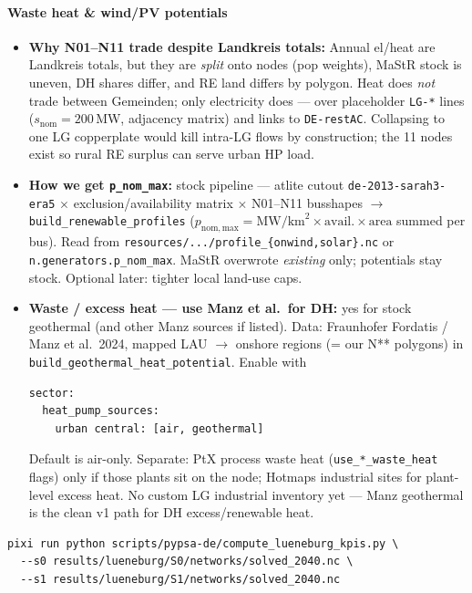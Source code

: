 \documentclass[11pt,a4paper]{article}
\begin{document}
\paragraph{Waste heat \& wind/PV potentials}
\begin{itemize}[leftmargin=*]
  \item \textbf{Why N01--N11 trade despite Landkreis totals:}
        Annual el/heat are Landkreis totals, but they are \emph{split} onto
        nodes (pop weights), MaStR stock is uneven, DH shares differ, and
        RE land differs by polygon. Heat does \emph{not} trade between
        Gemeinden; only electricity does --- over placeholder
        \texttt{LG-*} lines ($s_\mathrm{nom}=200$\,MW, adjacency matrix) and
        links to \texttt{DE-restAC}. Collapsing to one LG copperplate would
        kill intra-LG flows by construction; the 11 nodes exist so rural RE
        surplus can serve urban HP load.
  \item \textbf{How we get \texttt{p\_nom\_max}:}
        stock pipeline --- atlite cutout
        \texttt{de-2013-sarah3-era5} $\times$ exclusion/availability matrix
        $\times$ N01--N11 busshapes $\to$
        \texttt{build\_renewable\_profiles}
        ($p_\mathrm{nom,max}=\mathrm{MW/km}^2\times\mathrm{avail.}\times\mathrm{area}$
        summed per bus). Read from
        \texttt{resources/.../profile\_\{onwind,solar\}.nc} or
        \texttt{n.generators.p\_nom\_max}. MaStR overwrote \emph{existing}
        only; potentials stay stock. Optional later: tighter local land-use
        caps.
  \item \textbf{Waste / excess heat --- use Manz et al.\ for DH:}
        yes for stock geothermal (and other Manz sources if listed).
        Data: Fraunhofer Fordatis / Manz et al.\ 2024, mapped LAU $\to$
        onshore regions (= our N** polygons) in
        \texttt{build\_geothermal\_heat\_potential}. Enable with
\begin{lstlisting}
sector:
  heat_pump_sources:
    urban central: [air, geothermal]
\end{lstlisting}
        Default is air-only. Separate: PtX process waste heat
        (\texttt{use\_*\_waste\_heat} flags) only if those plants sit on the
        node; Hotmaps industrial sites for plant-level excess heat.
        No custom LG industrial inventory yet --- Manz geothermal is the
        clean v1 path for DH excess/renewable heat.
\end{itemize}

\begin{lstlisting}
pixi run python scripts/pypsa-de/compute_lueneburg_kpis.py \
  --s0 results/lueneburg/S0/networks/solved_2040.nc \
  --s1 results/lueneburg/S1/networks/solved_2040.nc
\end{lstlisting}
\end{document}

